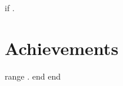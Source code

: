{{if .}}
\section{Achievements}
    \resumeItemListStart
    {{range .}} 
    {{end}}
    \resumeItemListEnd
{{end}}